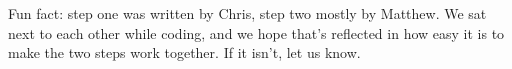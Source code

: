 \documentclass{article}
\begin{document}
Fun fact: step one was written by Chris, step two mostly by Matthew.
We sat next to each other while coding, and we hope that's reflected in how easy it is to make the two steps work together.
If it isn't, let us know.




\end{document}
